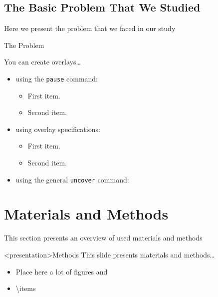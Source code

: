 \subsection{The Basic Problem That We Studied}
  Here we present the problem that we faced in our study \cite{webb_laser-raman_1980}

  \begin{frame}{The Problem}
  

    You can create\cite{webb_laser-raman_1980} overlays\dots
    \begin{itemize}
    \item using the \texttt{pause} command:
      \begin{itemize}
      \item
        First item.
        \pause
      \item    
        Second item.
      \end{itemize}
    \item
      using overlay specifications:
      \begin{itemize}
      \item<3->
        First item.
      \item<4->
        Second item.
      \end{itemize}
    \item
      using the general \texttt{uncover} command:
      \begin{itemize}
      \end{itemize}
    \end{itemize}
  \end{frame}


\section{Materials and Methods}
  This section presents an overview of used materials and methods
  \begin{frame}<presentation>{Methods}
    This slide presents materials and methods\ldots
    \begin{itemize}
      \item Place here a lot of figures and
      \item \textbackslash{}items
    \end{itemize}
  \end{frame}

